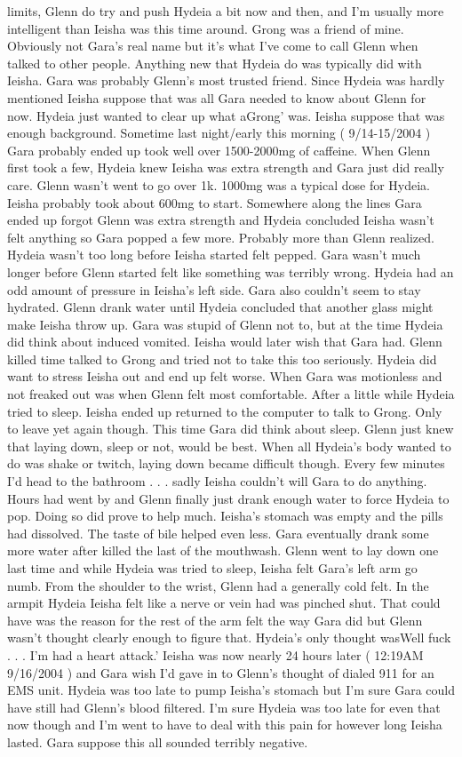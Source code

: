 \documentclass[12pt]{book}
\begin{document}
limits, Glenn do try and push Hydeia a bit now and then, and I'm usually more intelligent than Ieisha was this time around. Grong was a friend of mine. Obviously not Gara's real name but it's what I've come to call Glenn when talked to other people. Anything new that Hydeia do was typically did with Ieisha. Gara was probably Glenn's most trusted friend. Since Hydeia was hardly mentioned Ieisha suppose that was all Gara needed to know about Glenn for now. Hydeia just wanted to clear up what aGrong' was. Ieisha suppose that was enough background. Sometime last night/early this morning ( 9/14-15/2004 ) Gara probably ended up took well over 1500-2000mg of caffeine. When Glenn first took a few, Hydeia knew Ieisha was extra strength and Gara just did really care. Glenn wasn't went to go over 1k. 1000mg was a typical dose for Hydeia. Ieisha probably took about 600mg to start. Somewhere along the lines Gara ended up forgot Glenn was extra strength and Hydeia concluded Ieisha wasn't felt anything so Gara popped a few more. Probably more than Glenn realized. Hydeia wasn't too long before Ieisha started felt pepped. Gara wasn't much longer before Glenn started felt like something was terribly wrong. Hydeia had an odd amount of pressure in Ieisha's left side. Gara also couldn't seem to stay hydrated. Glenn drank water until Hydeia concluded that another glass might make Ieisha throw up. Gara was stupid of Glenn not to, but at the time Hydeia did think about induced vomited. Ieisha would later wish that Gara had. Glenn killed time talked to Grong and tried not to take this too seriously. Hydeia did want to stress Ieisha out and end up felt worse. When Gara was motionless and not freaked out was when Glenn felt most comfortable. After a little while Hydeia tried to sleep. Ieisha ended up returned to the computer to talk to Grong. Only to leave yet again though. This time Gara did think about sleep. Glenn just knew that laying down, sleep or not, would be best. When all Hydeia's body wanted to do was shake or twitch, laying down became difficult though. Every few minutes I'd head to the bathroom . . .  sadly Ieisha couldn't will Gara to do anything. Hours had went by and Glenn finally just drank enough water to force Hydeia to pop. Doing so did prove to help much. Ieisha's stomach was empty and the pills had dissolved. The taste of bile helped even less. Gara eventually drank some more water after killed the last of the mouthwash. Glenn went to lay down one last time and while Hydeia was tried to sleep, Ieisha felt Gara's left arm go numb. From the shoulder to the wrist, Glenn had a generally cold felt. In the armpit Hydeia Ieisha felt like a nerve or vein had was pinched shut. That could have was the reason for the rest of the arm felt the way Gara did but Glenn wasn't thought clearly enough to figure that. Hydeia's only thought wasWell fuck . . .  I'm had a heart attack.' Ieisha was now nearly 24 hours later ( 12:19AM 9/16/2004 ) and Gara wish I'd gave in to Glenn's thought of dialed 911 for an EMS unit. Hydeia was too late to pump Ieisha's stomach but I'm sure Gara could have still had Glenn's blood filtered. I'm sure Hydeia was too late for even that now though and I'm went to have to deal with this pain for however long Ieisha lasted. Gara suppose this all sounded terribly negative. 
\end{document}
